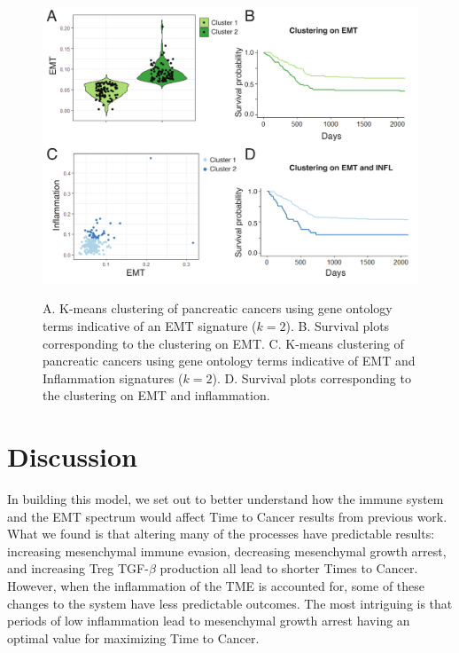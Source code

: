 \documentclass[11pt]{article}
\begin{document}
\begin{figure}
\center
{\includegraphics[width=\columnwidth]{FigTCGA.pdf}}
\caption{A. K-means clustering of pancreatic cancers using gene ontology terms indicative of an EMT signature ($k=2$). B. Survival plots corresponding to the clustering on EMT. C. K-means clustering of pancreatic cancers using gene ontology terms indicative of EMT and Inflammation signatures ($k=2$). D. Survival plots corresponding to the clustering on EMT and inflammation.}
\label{fig:tcga}
\end{figure}




\section{Discussion}\label{Discussion}
In building this model, we set out to better understand how the immune system and the EMT spectrum would affect Time to Cancer results from previous work.
What we found is that altering many of the processes have predictable results: increasing mesenchymal immune evasion, decreasing mesenchymal growth arrest, and increasing Treg TGF-$\beta$ production all lead to shorter Times to Cancer.
However, when the inflammation of the TME is accounted for, some of these changes to the system have less predictable outcomes.
The most intriguing is that periods of low inflammation lead to mesenchymal growth arrest having an optimal value for maximizing Time to Cancer.
\end{document}
